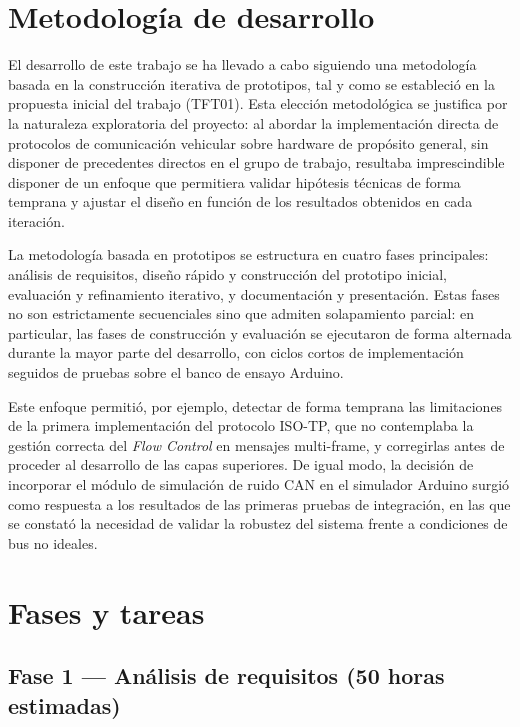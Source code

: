 \section{Metodología de desarrollo}

El desarrollo de este trabajo se ha llevado a cabo siguiendo una metodología basada en la construcción iterativa de prototipos, tal y como se estableció en la propuesta inicial del trabajo (TFT01). Esta elección metodológica se justifica por la naturaleza exploratoria del proyecto: al abordar la implementación directa de protocolos de comunicación vehicular sobre hardware de propósito general, sin disponer de precedentes directos en el grupo de trabajo, resultaba imprescindible disponer de un enfoque que permitiera validar hipótesis técnicas de forma temprana y ajustar el diseño en función de los resultados obtenidos en cada iteración.

La metodología basada en prototipos se estructura en cuatro fases principales: análisis de requisitos, diseño rápido y construcción del prototipo inicial, evaluación y refinamiento iterativo, y documentación y presentación. Estas fases no son estrictamente secuenciales sino que admiten solapamiento parcial: en particular, las fases de construcción y evaluación se ejecutaron de forma alternada durante la mayor parte del desarrollo, con ciclos cortos de implementación seguidos de pruebas sobre el banco de ensayo Arduino.

Este enfoque permitió, por ejemplo, detectar de forma temprana las limitaciones de la primera implementación del protocolo ISO-TP, que no contemplaba la gestión correcta del \textit{Flow Control} en mensajes multi-frame, y corregirlas antes de proceder al desarrollo de las capas superiores. De igual modo, la decisión de incorporar el módulo de simulación de ruido CAN en el simulador Arduino surgió como respuesta a los resultados de las primeras pruebas de integración, en las que se constató la necesidad de validar la robustez del sistema frente a condiciones de bus no ideales.


\section{Fases y tareas}

\subsection{Fase 1 — Análisis de requisitos \textnormal{(50 horas estimadas)}}

